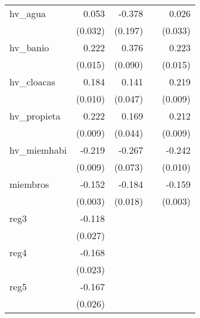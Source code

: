 {\begin{longtable}{l*{4}{D{.}{.}{-1}}}
\addlinespace
hv\_agua     &       0.053         &      -0.378         &                     &       0.026         \\
            &     (0.032)         &     (0.197)         &                     &     (0.033)         \\
\addlinespace
hv\_banio    &       0.222\sym{***}&       0.376\sym{***}&                     &       0.223\sym{***}\\
            &     (0.015)         &     (0.090)         &                     &     (0.015)         \\
\addlinespace
hv\_cloacas  &       0.184\sym{***}&       0.141\sym{**} &                     &       0.219\sym{***}\\
            &     (0.010)         &     (0.047)         &                     &     (0.009)         \\
\addlinespace
hv\_propieta &       0.222\sym{***}&       0.169\sym{***}&                     &       0.212\sym{***}\\
            &     (0.009)         &     (0.044)         &                     &     (0.009)         \\
\addlinespace
hv\_miemhabi &      -0.219\sym{***}&      -0.267\sym{***}&                     &      -0.242\sym{***}\\
            &     (0.009)         &     (0.073)         &                     &     (0.010)         \\
\addlinespace
miembros    &      -0.152\sym{***}&      -0.184\sym{***}&                     &      -0.159\sym{***}\\
            &     (0.003)         &     (0.018)         &                     &     (0.003)         \\
\addlinespace
reg3        &      -0.118\sym{***}&                     &                     &                     \\
            &     (0.027)         &                     &                     &                     \\
\addlinespace
reg4        &      -0.168\sym{***}&                     &                     &                     \\
            &     (0.023)         &                     &                     &                     \\
\addlinespace
reg5        &      -0.167\sym{***}&                     &                     &                     \\
            &     (0.026)         &                     &                     &                     \\

\end{longtable}}
